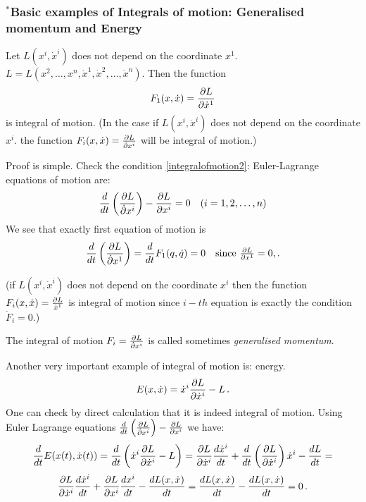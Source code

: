 \documentclass[12pt]{article}
\theoremstyle{theorem}
\numberwithin{equation}{section}
\begin{document}
{               \subsubsection {$^*$Basic examples of Integrals of motion: Generalised momentum and Energy}

 Let $L(x^i,\dot x^i)$ does not depend on the coordinate $x^1$.
    $L=L(x^2,\dots,x^n, \dot x^1,\dot x^2,\dots, \dot x^n)$. Then  the function
                   $$
       F_1(x,\dot x)={\partial L\over \partial\dot x^1}
                   $$
is integral of motion. (In the case if $L(x^i,\dot x^i)$ does not depend on the coordinate $x^i$.
    the function $F_i(x,\dot x)={\partial L\over \dot {\partial} x^i}$ will be integral of motion.)


Proof is simple. Check the condition \eqref{integralofmotion2}:
Euler-Lagrange equations of motion are:
          $$
          {d\over dt}\left({\partial L\over \dot {\partial} x^i}\right)-{\partial L\over \partial x^i}=0\quad (i=1,2,\dots,n)
          $$
 We see that exactly first equation of motion is
               $$
       {d\over dt}\left({\partial L\over \dot {\partial} x^1}\right)= {d\over dt}F_1(q,\dot q)=0
       \quad \hbox{since ${\partial L\over \partial x^1}=0,$}\,.
               $$


 (if $L(x^i,\dot x^i)$ does not depend on the coordinate $x^i$
    then the function $F_i(x,\dot x)={\partial L\over \dot x^1}$ is  integral of motion
    since $i-th$ equation is exactly the condition $\dot F_i=0$.)

    The integral of motion $F_i={\partial L\over \dot {\partial} x^i}$ is called sometimes {\it generalised momentum}.


    \m

    Another very important example of integral of motion is: energy.
      \begin{equation}\label{energy}
      E(x,\dot x)=\dot x^i {\partial L\over \partial \dot x^i}-L\,.
      \end{equation}
    One can check by direct calculation that it is indeed integral of motion.
    Using Euler Lagrange equations
    ${d\over dt}\left({\partial L\over \dot {\partial} x^i}\right)-{\partial L\over \partial x^i}$ we have:
           $$
     {d\over dt}E(x(t), \dot x(t))={d\over dt}\left(\dot x^i {\partial L\over \partial \dot x^i}-L\right)=
        {\partial L\over \partial \dot x^i}{d\dot x^i\over dt}+{d\over dt}\left({\partial L\over \partial\dot x^i}\right)\dot x^i-{dL\over dt}=
           $$
           $$
        {\partial L\over \partial \dot x^i}{d\dot x^i\over dt}+{\partial L\over \partial x^i}{dx^i\over dt}-{dL(x,\dot x)\over dt}=
        {dL(x,\dot x)\over dt}-{dL(x,\dot x)\over dt}=0\,.
           $$
}
\end{document}
